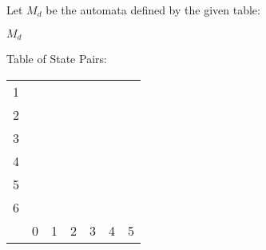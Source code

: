 Let $M_d$ be the automata defined by the given table:
\begin{automata}{$M_d$}
	
	
	
	
	
	
	
	
	
\end{automata}

Table of State Pairs: \\
\begin{center} \begin{tabular}{*{7}{c|}}
									\cline{1-2}
	1 &                       \\	\cline{1-3}
	2 &   &                   \\	\cline{1-4}
	3 &   &   &               \\	\cline{1-5}
	4 &   &   &   &           \\	\cline{1-6}
	5 &   &   &   &   &       \\	\hline
	6 &   &   &   &   &   &   \\	\hline
	  & 0 & 1 & 2 & 3 & 4 & 5 \\	\hline
\end{tabular} \end{center}